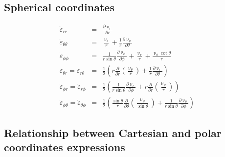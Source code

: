 \subsection{Spherical coordinates \label{ss:srsc}}

\begin{eqnarray}
\dot\varepsilon_{rr} 
&=& \frac{\partial \upnu_r}{\partial r} \\
\dot\varepsilon_{\theta\theta} 
&=& \frac{\upnu_r}{r} + \frac{1}{r} \frac{\partial \upnu_\theta}{\partial \theta}  \\
\dot\varepsilon_{\phi\phi} 
&=& \frac{1}{r \sin\theta} \frac{\partial \upnu_\phi}{\partial \phi} +
\frac{\upnu_r}{r} +\frac{\upnu_\theta \cot \theta}{r} \\
\dot\varepsilon_{\theta r} = \dot\varepsilon_{r\theta}   
&=& \frac{1}{2} \left( r \frac{\partial}{\partial r} (\frac{\upnu_\theta}{r} ) 
+\frac{1}{r} \frac{\partial \upnu_r}{\partial \theta} \right) \\
\dot\varepsilon_{\phi r} = \dot\varepsilon_{r\phi}      
&=&  \frac{1}{2} \left(  \frac{1}{r \sin\theta} \frac{\partial \upnu_r}{\partial \phi} 
+ r \frac{\partial }{\partial r} (\frac{\upnu_\phi}{r}) \right)  \\
\dot\varepsilon_{\phi \theta} = \dot\varepsilon_{\theta\phi} 
&=& \frac{1}{2} \left( \frac{\sin \theta}{r} \frac{\partial }{\partial \theta} (\frac{\upnu_\phi}{\sin\theta}) + \frac{1}{r \sin\theta} \frac{\partial \upnu_\theta}{\partial \phi}    \right) 
\end{eqnarray}



\subsection{Relationship between Cartesian and polar coordinates expressions}

